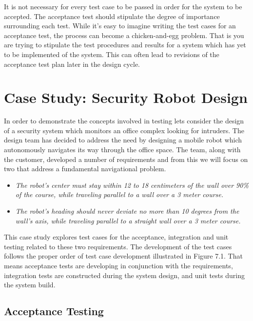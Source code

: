 {It is not necessary for every test case to be passed in order for the
system to be accepted. The acceptance test should stipulate the degree
of importance surrounding each test. While it's easy to imagine writing
the test cases for an acceptance test, the process can become a
chicken-and-egg problem. That is you are trying to stipulate the test
procedures and results for a system which has yet to be implemented of
the system. This can often lead to revisions of the acceptance test plan
later in the design cycle.

\section{Case Study: Security Robot Design}
\label{section:case-study-security-robot-design}

In order to demonstrate the concepts involved in testing lets consider
the design of a security system which monitors an office complex looking
for intruders. The design team has decided to address the need by
designing a mobile robot which autonomously navigates its way through
the office space. The team, along with the customer, developed a number
of requirements and from this we will focus on two that address a
fundamental navigational problem.

\begin{itemize}
\item
  \emph{The robot's center must stay within 12 to 18 centimeters of the
  wall over 90\% of the course, while traveling parallel to a wall over
  a 3 meter course.}
\item
  \emph{The robot's heading should never deviate no more than 10 degrees
  from the wall's axis, while traveling parallel to a straight wall over
  a 3 meter course.}
\end{itemize}

This case study explores test cases for the acceptance, integration and
unit testing related to these two requirements. The development of the
test cases follows the proper order of test case development illustrated
in Figure 7.1. That means acceptance tests are developing in conjunction
with the requirements, integration tests are constructed during the
system design, and unit tests during the system build.

\subsection*{Acceptance Testing}
\label{subsection:acceptance-testing-1}


}
